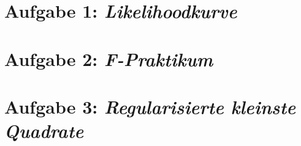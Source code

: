 \section*{Aufgabe 1: \emph{Likelihoodkurve}}

\section*{Aufgabe 2: \emph{F-Praktikum}}

\section*{Aufgabe 3: \emph{Regularisierte kleinste Quadrate}}


